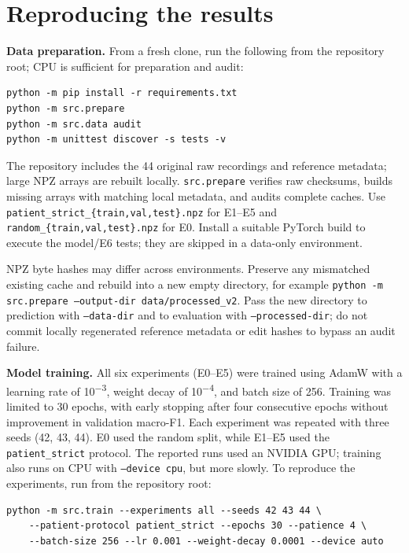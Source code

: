 \documentclass[10pt,a4paper]{article}
\begin{document}

\section{Reproducing the results}

\textbf{Data preparation.} From a fresh clone, run the following from the repository root; CPU is sufficient for preparation and audit:

{\small\begin{verbatim}
python -m pip install -r requirements.txt
python -m src.prepare
python -m src.data audit
python -m unittest discover -s tests -v
\end{verbatim}}

The repository includes the 44 original raw recordings and reference metadata; large NPZ arrays are rebuilt locally. \texttt{src.prepare} verifies raw checksums, builds missing arrays with matching local metadata, and audits complete caches. Use \texttt{patient\_strict\_\{train,val,test\}.npz} for E1--E5 and \texttt{random\_\{train,val,test\}.npz} for E0. Install a suitable PyTorch build to execute the model/E6 tests; they are skipped in a data-only environment.

NPZ byte hashes may differ across environments. Preserve any mismatched existing cache and rebuild into a new empty directory, for example \texttt{python -m src.prepare --output-dir data/processed\_v2}. Pass the new directory to prediction with \texttt{--data-dir} and to evaluation with \texttt{--processed-dir}; do not commit locally regenerated reference metadata or edit hashes to bypass an audit failure.

\textbf{Model training.} All six experiments (E0–E5) were trained using AdamW with a learning rate of 10\textsuperscript{−3}, weight decay of 10\textsuperscript{−4}, and batch size of 256. Training was limited to 30 epochs, with early stopping after four consecutive epochs without improvement in validation macro-F1. Each experiment was repeated with three seeds (42, 43, 44). E0 used the random split, while E1–E5 used the \texttt{patient\_strict} protocol. The reported runs used an NVIDIA GPU; training also runs on CPU with \texttt{--device cpu}, but more slowly. To reproduce the experiments, run from the repository root:

{\small\begin{verbatim}
python -m src.train --experiments all --seeds 42 43 44 \
    --patient-protocol patient_strict --epochs 30 --patience 4 \
    --batch-size 256 --lr 0.001 --weight-decay 0.0001 --device auto
\end{verbatim}}
\end{document}
